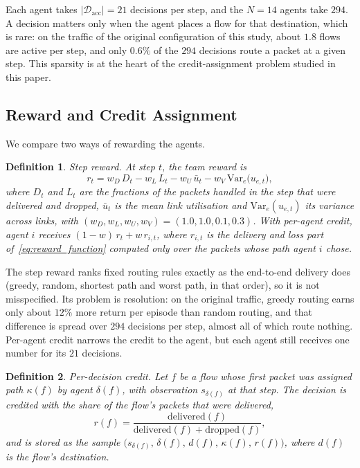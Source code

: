 \documentclass[10pt,journal,comsoc]{IEEEtran}
\newtheorem{definition}{Definition}
\begin{document}
Each agent takes $|\mathcal{D}_{\text{acc}}| = 21$ decisions per step, and the $N = 14$ agents take $294$. A decision matters only when the agent places a flow for that destination, which is rare: on the traffic of the original configuration of this study, about $1.8$ flows are active per step, and only $0.6\%$ of the $294$ decisions route a packet at a given step. This sparsity is at the heart of the credit-assignment problem studied in this paper.

\subsection{Reward and Credit Assignment}
We compare two ways of rewarding the agents.

\begin{definition}
  \label{def:step_reward}
  \emph{Step reward.} At step $t$, the team reward is
  \begin{equation}
    r_t = w_D\, D_t - w_L\, L_t - w_U\, \bar{u}_t - w_V\, \mathrm{Var}_{e}\big(u_{e,t}\big),
    \label{eq:reward_function}
  \end{equation}
  where $D_t$ and $L_t$ are the fractions of the packets handled in the step that were delivered and dropped, $\bar{u}_t$ is the mean link utilisation and $\mathrm{Var}_e(u_{e,t})$ its variance across links, with $(w_D, w_L, w_U, w_V) = (1.0, 1.0, 0.1, 0.3)$. With \emph{per-agent} credit, agent $i$ receives $(1-w)\,r_t + w\,r_{i,t}$, where $r_{i,t}$ is the delivery and loss part of~\eqref{eq:reward_function} computed only over the packets whose path agent $i$ chose.
\end{definition}

The step reward ranks fixed routing rules exactly as the end-to-end delivery does (greedy, random, shortest path and worst path, in that order), so it is not misspecified. Its problem is resolution: on the original traffic, greedy routing earns only about $12\%$ more return per episode than random routing, and that difference is spread over $294$ decisions per step, almost all of which route nothing. Per-agent credit narrows the credit to the agent, but each agent still receives one number for its $21$ decisions.

\begin{definition}
  \label{def:flow_credit}
  \emph{Per-decision credit.} Let $f$ be a flow whose first packet was assigned path $\kappa(f)$ by agent $\delta(f)$, with observation $s_{\delta(f)}$ at that step. The decision is credited with the share of the flow's packets that were delivered,
  \begin{equation}
    r(f) = \frac{\text{delivered}(f)}{\text{delivered}(f) + \text{dropped}(f)} ,
    \label{eq:flow_credit}
  \end{equation}
  and is stored as the sample $\big(s_{\delta(f)},\, \delta(f),\, d(f),\, \kappa(f),\, r(f)\big)$, where $d(f)$ is the flow's destination.
\end{definition}
\end{document}
